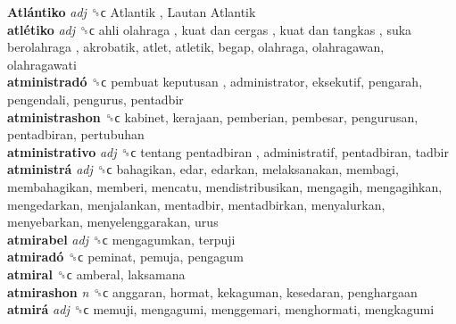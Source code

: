 \textbf{Atlántiko} \emph{adj}  ␝ϲ   Atlantik ,  Lautan Atlantik   \\
\textbf{atlétiko} \emph{adj}  ␝ϲ   ahli olahraga ,  kuat dan cergas ,  kuat dan tangkas ,  suka berolahraga , akrobatik, atlet, atletik, begap, olahraga, olahragawan, olahragawati  \\
\textbf{atministradó} ␝ϲ   pembuat keputusan , administrator, eksekutif, pengarah, pengendali, pengurus, pentadbir  \\
\textbf{atministrashon} ␝ϲ  kabinet, kerajaan, pemberian, pembesar, pengurusan, pentadbiran, pertubuhan  \\
\textbf{atministrativo} \emph{adj}  ␝ϲ   tentang pentadbiran , administratif, pentadbiran, tadbir  \\
\textbf{atministrá} \emph{adj}  ␝ϲ  bahagikan, edar, edarkan, melaksanakan, membagi, membahagikan, memberi, mencatu, mendistribusikan, mengagih, mengagihkan, mengedarkan, menjalankan, mentadbir, mentadbirkan, menyalurkan, menyebarkan, menyelenggarakan, urus  \\
\textbf{atmirabel} \emph{adj}  ␝ϲ  mengagumkan, terpuji  \\
\textbf{atmiradó} ␝ϲ  peminat, pemuja, pengagum  \\
\textbf{atmiral} ␝ϲ  amberal, laksamana  \\
\textbf{atmirashon} \emph{n}  ␝ϲ  anggaran, hormat, kekaguman, kesedaran, penghargaan  \\
\textbf{atmirá} \emph{adj}  ␝ϲ  memuji, mengagumi, menggemari, menghormati, mengkagumi  \\
